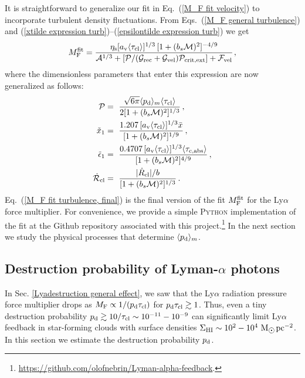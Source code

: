 \documentclass[fleqn,usenatbib]{mnras}
\newcommand{\taucl}{\tau_{\rm cl}}
\newcommand\Msun{\text{M}_{\astrosun}} %
\newcommand\HI{\ion{H}{I}\xspace} %
\begin{document}
It is straightforward to generalize our fit in Eq.~(\ref{M_F fit velocity}) to incorporate turbulent density fluctuations. From Eqs.~(\ref{M_F general turbulence}) and (\ref{xtilde expression turb})--(\ref{epsilontilde expression turb}) we get 
\begin{equation}
    M_{\rm F}^{\rm fit} =  \dfrac{\eta_{\rm s} [a_{\rm v}\langle \taucl \rangle ]^{1/3} \, [1 + (b_s \mathcal{M})^2]^{-4/9}}{\mathcal{A}^{1/3} + [\mathcal{P}/(\mathcal{G}_{\rm rec} + \mathcal{G}_{\rm vel})\mathcal{P}_{\rm crit,ext}] + \mathcal{F}_{\rm vel}} \hspace{1 pt} , \label{M_F fit turbulence, final}
\end{equation}
where the dimensionless parameters that enter this expression are now generalized as follows:
\begin{align}
    \mathcal{P} &=~ \dfrac{\sqrt{6 \pi} \langle p_{\rm d} \rangle_{m} \langle \taucl \rangle}{2[1+ (b_s \mathcal{M})^2]^{1/3}} \,, \\ \Tilde{x}_1 &=~ \dfrac{1.207 \, [a_{\rm v} \langle \taucl \rangle]^{1/3} \Bar{x}}{[1 + (b_s \mathcal{M})^2]^{1/9}}   \,, \\ \Tilde{\epsilon}_1 &=~ \dfrac{0.4707 \, [a_{\rm v} \langle \taucl \rangle]^{1/3} \langle \tau_{\rm c,abs} \rangle }{[1 + (b_s \mathcal{M})^2]^{4/9}}  \,,  \\ \Dot{\mathcal{R}}_{\rm cl} &=~  \dfrac{\lvert \Dot{R}_{\rm cl} \rvert/b}{ [1 + (b_s \mathcal{M})^2]^{1/3}} \, .
\end{align}
Eq.~(\ref{M_F fit turbulence, final}) is the final version of the fit $M_{\rm F}^{\rm fit}$ for the Ly$\alpha$ force multiplier. For convenience, we provide a simple \textsc{Python} implementation of the fit at the Github repository associated with this project.\footnote{\url{https://github.com/olofnebrin/Lyman-alpha-feedback}.} In the next section we study the physical processes that determine $\langle p_{\rm d} \rangle_{ m}$.

\subsection{Destruction probability of Lyman-\texorpdfstring{\boldmath$\alpha$}{alpha} photons}
\label{Lya destruction}

In Sec. \ref{Lyadestruction general effect}, we saw that the Ly$\alpha$ radiation pressure force multiplier drops as $M_{\rm F} \propto 1/(p_{\rm d} \tau_{\rm cl})$ for $p_{\rm d} \tau_{\rm cl} \gtrsim 1$. Thus, even a tiny destruction probability $p_{\rm d} \gtrsim 10/\taucl \sim 10^{-11} - 10^{-9}$ can significantly limit Ly$\alpha$ feedback in star-forming clouds with \HI surface densities $\Sigma_{\rm H I} \sim 10^2 - 10^4 ~ \Msun \hspace{1 pt} \rm pc^{-2}$. In this section we estimate the destruction probability $p_{\rm d}$.
\end{document}

